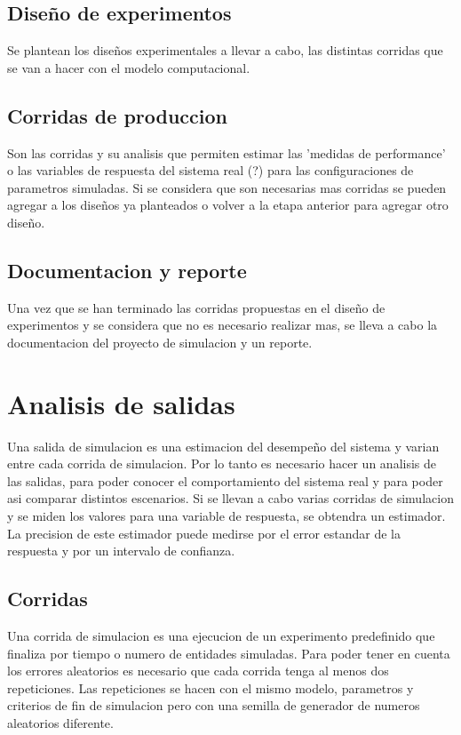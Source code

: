 \documentclass[a4paper]{article}
\begin{document}
\subsection*{Diseño de experimentos}
Se plantean los diseños experimentales a llevar a cabo, las distintas corridas que se van a hacer 
con el modelo computacional.

\subsection*{Corridas de produccion}
Son las corridas y su analisis que permiten estimar las 'medidas de performance' o las variables de 
respuesta del sistema real (?) para las configuraciones de parametros simuladas.
Si se considera que son necesarias mas corridas se pueden agregar a los diseños ya planteados o volver 
a la etapa anterior para agregar otro diseño.

\subsection*{Documentacion y reporte}
Una vez que se han terminado las corridas propuestas en el diseño de experimentos y se considera que no
es necesario realizar mas, se lleva a cabo la documentacion del proyecto de simulacion y un reporte.

\section*{Analisis de salidas}
Una salida de simulacion es una estimacion del desempeño del sistema y varian entre cada corrida de 
simulacion. Por lo tanto es necesario hacer un analisis de las salidas, para poder conocer el 
comportamiento del sistema real y para poder asi comparar distintos escenarios.
Si se llevan a cabo varias corridas de simulacion y se miden los valores para una variable de 
respuesta, se obtendra un estimador. La precision de este estimador puede medirse por el error 
estandar de la respuesta y por un intervalo de confianza.

\subsection*{Corridas}
Una corrida de simulacion es una ejecucion de un experimento predefinido que finaliza por tiempo o numero
de entidades simuladas. 
Para poder tener en cuenta los errores aleatorios es necesario que cada corrida tenga al menos dos 
repeticiones. Las repeticiones se hacen con el mismo modelo, parametros y criterios de fin de simulacion pero
con una semilla de generador de numeros aleatorios diferente.
\end{document}
